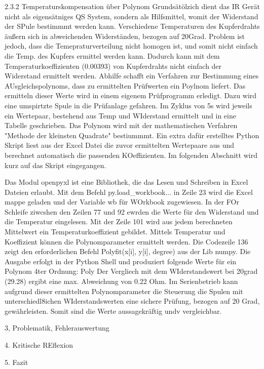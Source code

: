 	2.3.2 Temperaturskompensation über Polynom
		Grundsätölzich dient das IR Gerät nicht als eigensätniges QS System, sondern als 
		Hilfsmittel, womit der Widerstand der SPule bestimmmt werden kann. Verschiedene Temperaturen des Kupferdrahts 
		äußern sich in abweichenden Widerständen, bezogen auf 20Grad. Problem ist jedoch, dass die Temepraturverteilung nicht
		homogen ist, und somit nicht einfach die Temp. des Kupfers ermittel werden kann. Dadurch kann mit dem Temperaturkoeffizienten (0.00393) von Kupferdrahts
		nicht einfach der Widerstand ermittelt werden. 
		Abhilfe schafft ein Verfahren zur Bestimmung eines AUsgleichspolynoms, dass zu ermittelten Prüfwerten
		ein Poylnom liefert. Das ermitteln dieser Werte wird in einem eigenem Prüfprogramm erledigt. Dazu wird eine umspirtzte Spule in die Prüfanlage gefahren.
		Im Zyklus von 5s wird jeweils ein Wertepaar, bestehend aus Temp und WIderstand ermittelt und in eine Tabelle geschrieben.
		Das Polynom wird mit der mathematischen Verfahren "Methode der kleinsten Quadrate" bestiummmt.
		Ein extra dafür erstelltes Python Skript liest aus der Excel Datei die zuvor ermittelten Wertepaare aus und 
		berechnet automatisch die passenden KOeffizienten. Im folgenden Abschnitt wird kurz auf das Skript eingegangen.
	
		Das Modul openpyxl ist eine Bibliothek, die das Lesen und Schreiben in Excel Dateien erlaubt.
		Mit dem Befehl py.load_workbook... in Zeile 23 wird die Excel mappe geladen und der Variable wb für WOrkbook zugewiesen.
		In der FOr Schleife ziwcshen den Zeilen 77 und 92 ewrden die Werte für den Widerstand und die Temperatur eingelesen. 
		Mit der Zeile 101 wird aus jedem berechneten Mittelwert ein Temperaturkoeffizient gebildet. Mittels Temperatur und Koeffizient können
		die Polynomparameter ermittelt werden. Die Codezeile 136 zeigt den erforderlichen Befehl Polyfit(x[i], y[i], degree) aus der Lib numpy. 
		Die Ausgabe erfolgt in der Python Shell und produziert folgende Werte für ein Polynom 4ter Ordnung:
		\image Poly
		Der Vergliech mit dem WIderstandswert bei 20grad (29.28) ergibt eine max. Abweichung von 0.22 Ohm. 
		Im Serienbetrieb kann aufgrund dieser ermittelten Polynomparameter die Steuerung die Spulen mit unterschiedl8ichen WIderstandswerten 
		eine sichere Prüfung, bezogen auf 20 Grad, gewährleisten. Somit sind die Werte aussagekräftig undv vergleichbar.
	
3, Problematik, Fehlerauswertung


4. Kritische REflexion

5. Fazit